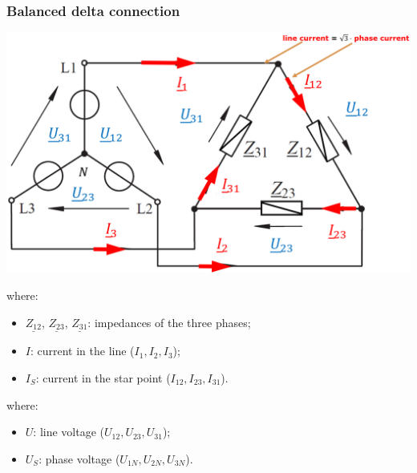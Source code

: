 \documentclass{article}
\begin{document}

\subsubsection{Balanced delta connection}
\begin{center}
    \includegraphics[width=.75\textwidth]{media/delta_connection.png}
\end{center}


where:
\begin{itemize}
    \item $\underline{Z_12}$, $\underline{Z_23}$, $\underline{Z_31}$: impedances of the three phases;
    \item $I$: current in the line ($I_1, I_2, I_3$);
    \item $I_S$: current in the star point ($I_{12}, I_{23}, I_{31}$).
\end{itemize}

where:
\begin{itemize}
    \item $U$: line voltage ($U_{12}, U_{23}, U_{31}$);
    \item $U_S$: phase voltage ($U_{1N}, U_{2N}, U_{3N}$).
\end{itemize}

\end{document}

